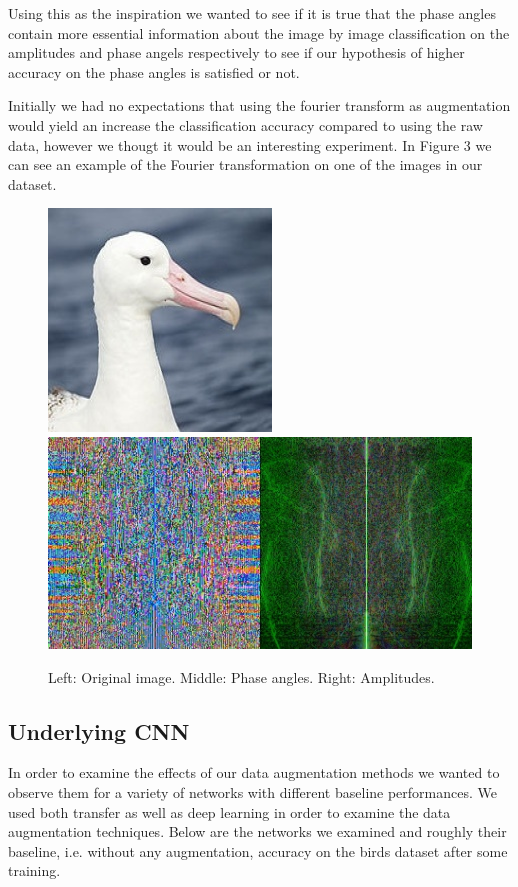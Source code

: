 \documentclass{article}
\begin{document}
Using this as the inspiration we wanted to see if it is true that the phase angles contain more essential information about the image by image classification on the amplitudes 
and phase angels respectively to see if our hypothesis of higher accuracy on the phase angles is satisfied or not. 

Initially we had no expectations that using the fourier transform as augmentation would yield an increase the classification accuracy compared to using 
the raw data, however we thougt it would be an interesting experiment. 
In Figure 3 we can see an example of the Fourier transformation on one of the images in our dataset. 

\begin{figure}[!htb]
	\raggedleft
	\includegraphics[scale=0.30]{fourier1}
	\endminipage
	\raggedleft
	\includegraphics[trim=0cm 0cm 0cm 0cm, scale=0.30]{fourier2}
	\endminipage
	\caption{Left: Original image. Middle: Phase angles. Right: Amplitudes.}
\end{figure}

\subsection{Underlying CNN}

In order to examine the effects of our data augmentation methods we wanted to observe them for a variety of networks with different baseline performances. We used both transfer as well as deep learning in order to examine the data augmentation techniques. Below are the networks we examined and roughly their baseline, i.e. without any augmentation, accuracy on the birds dataset after some training.
\end{document}
